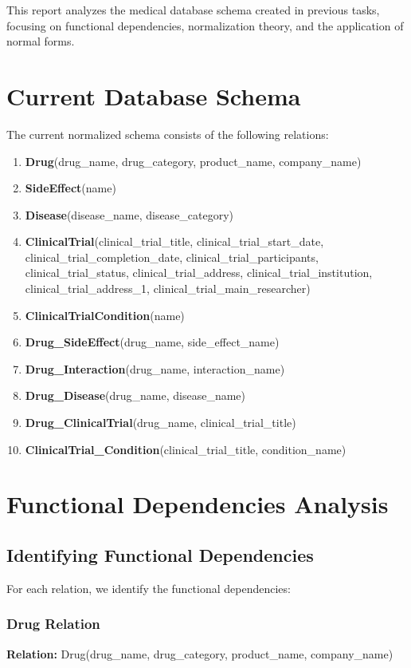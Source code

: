 \documentclass[12pt,a4paper]{article}
\begin{document}
This report analyzes the medical database schema created in previous tasks, focusing on functional dependencies, normalization theory, and the application of normal forms.

\section{Current Database Schema}

The current normalized schema consists of the following relations:

\begin{enumerate}
    \item \textbf{Drug}(drug\_name, drug\_category, product\_name, company\_name)
    \item \textbf{SideEffect}(name)
    \item \textbf{Disease}(disease\_name, disease\_category)
    \item \textbf{ClinicalTrial}(clinical\_trial\_title, clinical\_trial\_start\_date, clinical\_trial\_completion\_date, clinical\_trial\_participants, clinical\_trial\_status, clinical\_trial\_address, clinical\_trial\_institution, clinical\_trial\_address\_1, clinical\_trial\_main\_researcher)
    \item \textbf{ClinicalTrialCondition}(name)
    \item \textbf{Drug\_SideEffect}(drug\_name, side\_effect\_name)
    \item \textbf{Drug\_Interaction}(drug\_name, interaction\_name)
    \item \textbf{Drug\_Disease}(drug\_name, disease\_name)
    \item \textbf{Drug\_ClinicalTrial}(drug\_name, clinical\_trial\_title)
    \item \textbf{ClinicalTrial\_Condition}(clinical\_trial\_title, condition\_name)
\end{enumerate}

\section{Functional Dependencies Analysis}

\subsection{Identifying Functional Dependencies}

For each relation, we identify the functional dependencies:

\subsubsection{Drug Relation}
\textbf{Relation:} Drug(drug\_name, drug\_category, product\_name, company\_name)\\
\end{document}
